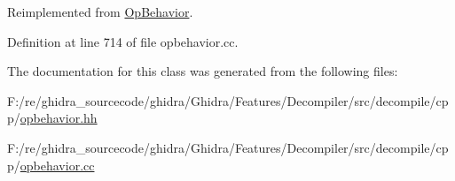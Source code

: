 Reimplemented from \mbox{\hyperlink{class_op_behavior_aeeed3af7aa35264b31a1f182884214a9}{Op\+Behavior}}.



Definition at line 714 of file opbehavior.\+cc.



The documentation for this class was generated from the following files\+:\begin{DoxyCompactItemize}
\item 
F\+:/re/ghidra\+\_\+sourcecode/ghidra/\+Ghidra/\+Features/\+Decompiler/src/decompile/cpp/\mbox{\hyperlink{opbehavior_8hh}{opbehavior.\+hh}}\item 
F\+:/re/ghidra\+\_\+sourcecode/ghidra/\+Ghidra/\+Features/\+Decompiler/src/decompile/cpp/\mbox{\hyperlink{opbehavior_8cc}{opbehavior.\+cc}}\end{DoxyCompactItemize}
